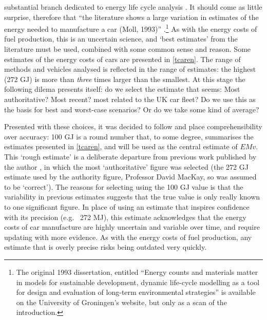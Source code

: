 substantial branch dedicated to energy life cycle analysis \citep{kuemmel1997life,
cornelissen2002value}. It should come as little surprise, therefore that
``the literature shows a large variation in estimates of the energy needed to
manufacture a car (Moll, 1993)''
\citep[p.139]{Wee2000}.\footnote{The original 1993 dissertation, entitled
``Energy counts and materials matter in models for sustainable development,
dynamic life-cycle modelling as a tool for design and evaluation of long-term
environmental strategies'' is available on the University of Groningen's
website, but only as a scan of the introduction.
}
As with the energy
costs of fuel production, this is an uncertain science, and `best estimates'
from the literature must be used, combined with some common
sense and reason. Some estimates of the energy costs of cars are presented in
\cref{tcaren}. The range of methods and vehicles analysed is reflected in
the range of estimates: the highest (272 GJ) is more than \emph{three} times
larger than the smallest. At this stage the following dilema presents itself:
do we select the estimate that seems: Most authoritative? Most recent?
most related to the UK car fleet? Do we use this as the basis for best
and worst-case scenarios? Or do we take some kind of average?

Presented with these choices, it was decided to follow \citet{MacKay2009} and
place comprehensibility over accuracy: 100 GJ is a round number
that, to some degree, summarises the estimates presented in
\cref{tcaren}, and will be used as the central estimate of $EMv$.
This `rough estimate' is a deliberate
departure from previous work published by the author
\citep{Lovelace2011-assessing}, in which the most
`authoritative' figure was selected (the 272 GJ estimate used by the
authority figure, Professor David MacKay, so was assumed to be
`correct'). The reasons for selecting using the 100 GJ value is that the
variability in previous estimates suggests that the true value is
only really known to one significant figure. In place of using an
estimate that inspires confidence with its precision (e.g.~ 272 MJ),
this estimate acknowledges that the energy costs of car manufacture are highly
uncertain and variable over time, and require updating with more evidence. As
with the energy costs of fuel production, any estimate that is overly precise
risks being outdated very quickly.

